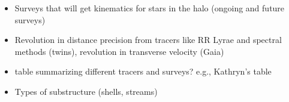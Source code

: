 \begin{itemize}
	\item Surveys that will get kinematics for stars in the halo (ongoing and future surveys)
	\item Revolution in distance precision from tracers like RR Lyrae and spectral methods (twins), revolution in transverse velocity (Gaia)
	\item table summarizing different tracers and surveys? e.g., Kathryn's table
	\item Types of substructure (shells, streams)
\end{itemize}



